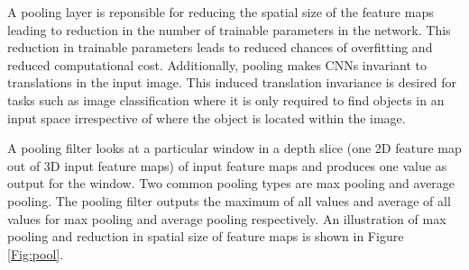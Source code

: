 A pooling layer is reponsible for reducing the spatial size of the feature maps leading to reduction in the number of trainable parameters in the network. This reduction in trainable parameters leads to reduced chances of overfitting and reduced computational cost. Additionally, pooling makes CNNs invariant to translations in the input image. This induced translation invariance is desired for tasks such as image classification where it is only required to find objects in an input space irrespective of where the object is located within the image. 

A pooling filter looks at a particular window in a depth slice (one 2D feature map out of 3D input feature maps) of input feature maps and produces one value as output for the window. Two common pooling types are max pooling and average pooling. The pooling filter outputs the maximum of all values and average of all values for max pooling and average pooling respectively. An illustration of max pooling and reduction in spatial size of feature maps is shown in Figure \ref{Fig:pool}.

